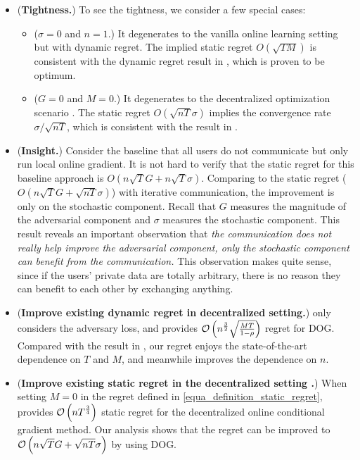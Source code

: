 \documentclass{article}
\begin{document}
\begin{itemize}
\item ({\bf Tightness.}) To see the tightness, we consider a few special cases:
\begin{itemize}
\item ($\sigma= 0$ and $n=1$.) It degenerates to the vanilla online learning setting but with dynamic regret. The implied static regret $O(\sqrt{TM})$ is consistent with the dynamic regret result in \citet{Zhao:2018wx}, which is proven to be optimum. 
\item ($G=0$ and $M=0$.) It degenerates to the decentralized optimization scenario \citet{Duchi:2012hp,Tang:2018un}. The static regret $O(\sqrt{nT}\sigma)$ implies the convergence rate $\sigma / \sqrt{nT}$, which is consistent with the result in \citet{Duchi:2012hp,Tang:2018un}. 
\end{itemize}
\item ({\bf Insight.}) Consider the baseline that all users do not communicate but only run local online gradient. It is not hard to verify that the static regret for this baseline approach is $O(n\sqrt{T}G + n\sqrt{T}\sigma)$. Comparing to the static regret ($O(n\sqrt{T}G + \sqrt{nT}\sigma)$) with iterative communication, the improvement is only on the stochastic component. Recall that $G$ measures the magnitude of the adversarial component and $\sigma$ measures the stochastic component. This result reveals an important observation that \emph{the communication does not really help improve the adversarial component, only the stochastic component can benefit from the communication.} This observation makes quite sense, since if the users' private data are totally arbitrary, there is no reason they can benefit to each other by exchanging anything.
\item ({\bf Improve existing dynamic regret in decentralized setting.}) \citet{8015179Shahram} only considers the adversary loss, and provides ${\mathcal{O}\left( n^{\frac{3}{2}}\sqrt{\frac{MT}{1-\rho}}  \right)}$ regret for DOG. Compared with the result in \citet{8015179Shahram}, our regret enjoys the state-of-the-art dependence on $T$ and $M$, and meanwhile improves the dependence on $n$.
\item ({\bf Improve existing static regret in the decentralized setting \citep{pmlr-v70-zhang17g}.}) When setting $M=0$ in the  regret defined in \eqref{equa_definition_static_regret}, \citet{pmlr-v70-zhang17g} provides ${\mathcal{O}\left( n T^{\frac{3}{4}} \right)}$ static regret for the decentralized online conditional gradient method. Our analysis shows that the regret can be improved to ${\mathcal{O}\left( n\sqrt{T}G+\sqrt{nT}\sigma \right)}$ by using DOG. 
\end{itemize} 
\end{document}
